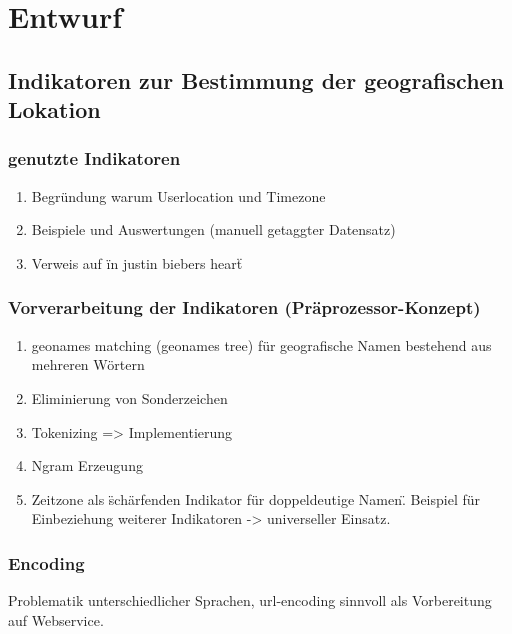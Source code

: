 \chapter{Entwurf} 

\section{Indikatoren zur Bestimmung der geografischen Lokation}

	\subsection{genutzte Indikatoren}
		\begin{enumerate}
			\item Begründung warum Userlocation und Timezone
			\item Beispiele und Auswertungen (manuell getaggter Datensatz)
			\item Verweis auf \"in justin biebers heart\"
		\end{enumerate}


	\subsection{Vorverarbeitung der Indikatoren (Präprozessor-Konzept)}
		\begin{enumerate}
			\item geonames matching (geonames tree) für geografische Namen bestehend aus mehreren Wörtern
			\item Eliminierung von Sonderzeichen
			\item Tokenizing => Implementierung
			\item {} Ngram Erzeugung
			\item {} Zeitzone als \"schärfenden Indikator für doppeldeutige Namen\". Beispiel für Einbeziehung weiterer Indikatoren -> universeller Einsatz. 
		\end{enumerate}

	\subsection{Encoding}
		Problematik unterschiedlicher Sprachen, 
		url-encoding sinnvoll als Vorbereitung auf Webservice. 

